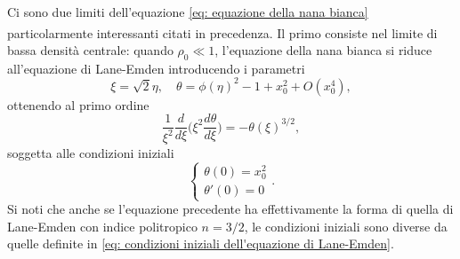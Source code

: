 \documentclass{article}
\newcommand{\supcite}[2][]{\textsuperscript{\cite[#1]{#2}}}
\numberwithin{equation}{section}
\begin{document}
Ci sono due limiti dell'equazione \eqref{eq: equazione della nana bianca} particolarmente interessanti citati in precedenza. Il primo\supcite[pgg.~211--212]{chandrasekhar1935} consiste nel limite di bassa densità centrale: quando $\rho_0 \ll 1$, l'equazione della nana bianca si riduce all'equazione di Lane-Emden introducendo i parametri
\begin{equation}
    \xi = \sqrt{2}\eta,\quad \theta = \phi(\eta)^2 - 1 + x_0^2 + O(x_0^4),
\end{equation}
ottenendo al primo ordine 
\begin{equation}
    \frac{1}{\xi^2}\frac{d}{d\xi}\bigg(\xi^2\frac{d\theta}{d\xi}\bigg) = -\theta(\xi)^{3/2},
\end{equation}
soggetta alle condizioni iniziali
\begin{equation}
    \begin{cases}
        \theta(0) = x_0^2 \\
        \theta'(0) = 0
    \end{cases}.
\end{equation}
Si noti che anche se l'equazione precedente ha effettivamente la forma di quella di Lane-Emden con indice politropico $n = 3/2$, le condizioni iniziali sono diverse da quelle definite in \eqref{eq: condizioni iniziali dell'equazione di Lane-Emden}. 
\end{document}

